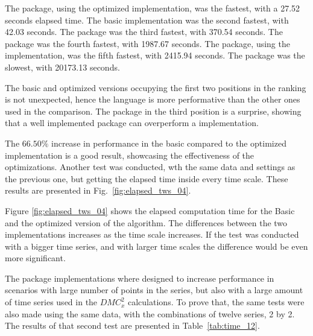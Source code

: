 \documentclass[article]{jss}
\begin{document}
The  package, using the optimized  implementation, was the fastest, with a 27.52 seconds elapsed time. The basic  implementation was the second fastest, with 42.03 seconds. The  package was the third fastest, with 370.54 seconds. The  package was the fourth fastest, with 1987.67 seconds. The  package, using the  implementation, was the fifth fastest, with 2415.94 seconds. The  package was the slowest, with 20173.13 seconds.

The  basic and optimized versions occupying the first two positions in the ranking is not unexpected, hence the  language is more performative than the other ones used in the comparison. The  package in the third position is a surprise, showing that a well implemented  package can overperform a  implementation.

The $66.50\%$ increase in performance in the basic compared to the optimized  implementation is a good result, showcasing the effectiveness of the optimizations. Another test was conducted, wth the same data and settings as the previous one, but getting the elapsed time inside every time scale. These results are presented in Fig.~\ref{fig:elapsed_tws_04}.


Figure \ref{fig:elapsed_tws_04} shows the elapsed computation time for the Basic and the optimized version of the algorithm. The differences between the two implementations increases as the time scale increases. If the test was conducted with a bigger time series, and with larger time scales the difference would be even more significant.

The  package implementations where designed to increase performance in scenarios with large number of points in the series, but also with a large amount of time series used in the $DMC_x^2$ calculations. To prove that, the same tests were also made using the same data, with the combinations of twelve series, 2 by 2. The results of that second test are presented in Table~\ref{tab:time_12}.
\end{document}
